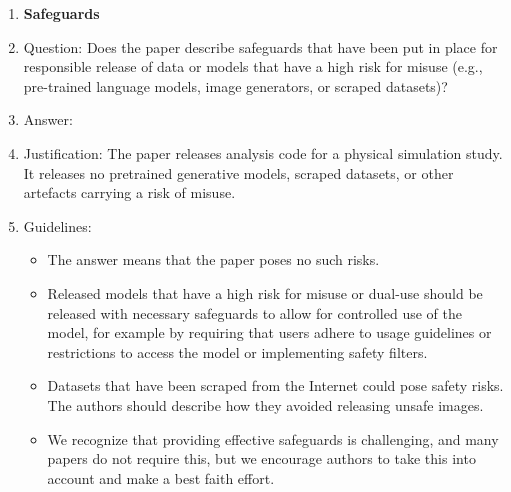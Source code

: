 \begin{enumerate}
\item {\bf Safeguards}
    \item[] Question: Does the paper describe safeguards that have been put in place for responsible release of data or models that have a high risk for misuse (e.g., pre-trained language models, image generators, or scraped datasets)?
    \item[] Answer: \answerNA{} %
    \item[] Justification: The paper releases analysis code for a physical simulation study. It releases no pretrained generative models, scraped datasets, or other artefacts carrying a risk of misuse.
    \item[] Guidelines:
    \begin{itemize}
        \item The answer \answerNA{} means that the paper poses no such risks.
        \item Released models that have a high risk for misuse or dual-use should be released with necessary safeguards to allow for controlled use of the model, for example by requiring that users adhere to usage guidelines or restrictions to access the model or implementing safety filters. 
        \item Datasets that have been scraped from the Internet could pose safety risks. The authors should describe how they avoided releasing unsafe images.
        \item We recognize that providing effective safeguards is challenging, and many papers do not require this, but we encourage authors to take this into account and make a best faith effort.
    \end{itemize}


\end{enumerate}
